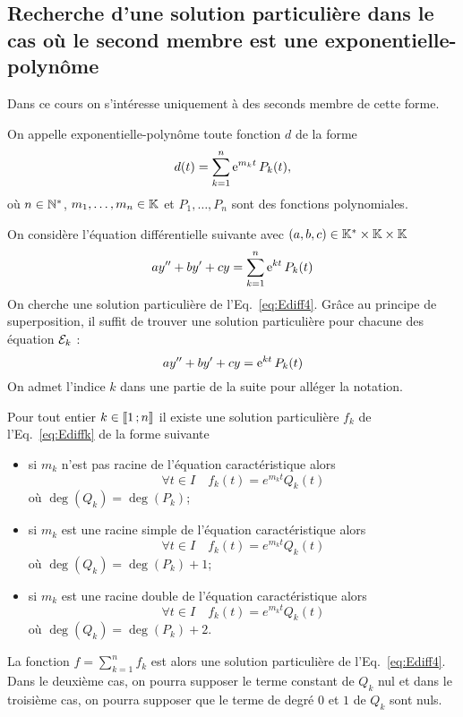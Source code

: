 \subsection{Recherche d'une solution particulière dans le cas où le second membre est une \og exponentielle-polynôme \fg}
\label{subsec:recherchesolutionpartexppol}
Dans ce cours on s'intéresse uniquement à des seconds membre de cette forme.
\begin{defdef}
  On appelle exponentielle-polynôme toute fonction $d$ de la forme
  \begin{equation}
    d(t)=\sum_{k=1}^{n} \operatorname{e}^{m_k t} P_k (t),
  \end{equation}
où $n \in \mathbb{N}^*$, $m_1, \ldots, m_n \in \mathbb{K}$ et $ P_1, \ldots, P_n$ sont des fonctions polynomiales. 
\end{defdef}
On considère l'équation différentielle  suivante avec $(a,b,c) \in \mathbb{K}^{*}\times\mathbb{K}\times\mathbb{K}$
\begin{equation}
  \label{eq:Ediff4}
  ay''+by'+cy=\sum_{k=1}^{n} \operatorname{e}^{kt} P_k(t)
\end{equation}
On cherche une solution particulière de l'Eq.~\eqref{eq:Ediff4}. Grâce au principe de superposition, il suffit de trouver une solution particulière pour chacune des équation $\mathcal{E}_k$ : 
\begin{equation}
  \label{eq:Ediffk}
  ay''+by'+cy= \operatorname{e}^{kt} P_k(t)
\end{equation}
On admet l'indice $k$ dans une partie de la suite pour alléger la notation.
\begin{theo}
  Pour tout entier $k \in \mathopen{\llbracket}1\mathclose{}\mathpunct{};n\mathclose{\rrbracket}$ il existe une solution particulière $f_k$ de l'Eq.~\eqref{eq:Ediffk} de la forme suivante
  \begin{itemize}
  \item si $m_k$ n'est pas racine de l'équation caractéristique alors
    \begin{equation}
      \forall t \in I \quad f_k(t)=e^{m_k t} Q_k(t)
    \end{equation}
    où $\deg(Q_k)=\deg(P_k)$;
  \item si $m_k$ est une racine simple de l'équation caractéristique alors 
    \begin{equation}
      \forall t \in I \quad f_k(t)=e^{m_k t} Q_k(t)
    \end{equation}
    où $\deg(Q_k)=\deg(P_k)+1$;
  \item si $m_k$ est une racine double de l'équation caractéristique alors 
    \begin{equation}
      \forall t \in I \quad f_k(t)=e^{m_k t} Q_k(t)
    \end{equation}
    où $\deg(Q_k)=\deg(P_k)+2$.
  \end{itemize}
La fonction $f=\sum_{k=1}^{n} f_k$ est alors une solution particulière de l'Eq.~\eqref{eq:Ediff4}. Dans le deuxième cas, on pourra supposer le terme constant de $Q_k$ nul et dans le troisième cas, on pourra supposer que le terme de degré $0$ et $1$ de $Q_k$ sont nuls.
\end{theo}
